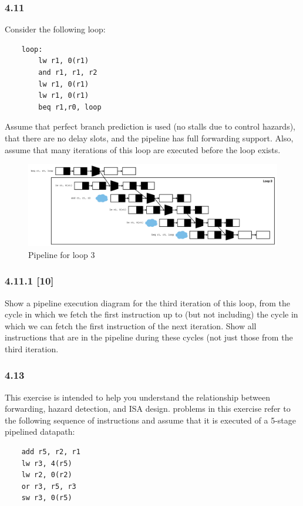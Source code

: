 \documentclass[fleqn]{article}
\begin{document}
\subsubsection*{4.11} Consider the following loop:
\begin{lstlisting}
    loop:
        lw r1, 0(r1)
        and r1, r1, r2
        lw r1, 0(r1)
        lw r1, 0(r1)
        beq r1,r0, loop
\end{lstlisting}
Assume that perfect branch prediction is used (no stalls due to control hazards), that there are no delay slots,
and the pipeline has full forwarding support. Also, assume that many iterations of this loop are executed
before the loop exists.

\begin{figure}[H]
    \centering
    \includegraphics[width=6.5in]{p4.11.1.png}
    \caption{Pipeline for loop 3}
\end{figure}


\subsubsection*{4.11.1 [10] \textrangle} Show a pipeline execution diagram for the third iteration of this loop, from the cycle in which we
fetch the first instruction up to (but not including) the cycle in which we can fetch the first instruction of
the next iteration. Show all instructions that are in the pipeline during these cycles (not just those from the
third iteration.
\vspace{0.125in}

\subsubsection*{4.13} This exercise is intended to help you understand the relationship between forwarding, hazard detection,
and ISA design. problems in this exercise refer to the following sequence of instructions and assume that it
is executed of a 5-stage pipelined datapath:
\begin{lstlisting}
    add r5, r2, r1
    lw r3, 4(r5)
    lw r2, 0(r2)
    or r3, r5, r3
    sw r3, 0(r5)
\end{lstlisting}
\end{document}
